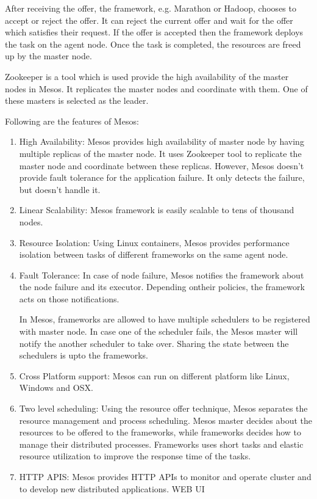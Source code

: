 After receiving the offer, the framework, e.g. Marathon or Hadoop, chooses to accept or reject the offer. It can reject the current offer and wait for the offer which satisfies their request. If the offer is accepted then the framework deploys the task on the agent node. Once the task is completed, the resources are freed up by the master node. 

Zookeeper is a tool which is used provide the high availability of the master nodes in Mesos. It replicates the master nodes and coordinate with them. One of these masters is selected as the leader.


Following are the features of Mesos:

\begin{enumerate}
\item High Availability: Mesos provides high availability of master node by having multiple replicas of the master node. It uses Zookeeper tool to replicate the master node and coordinate between these replicas. However, Mesos doesn't provide fault tolerance for the application failure. It only detects the failure, but doesn't handle it.

\item Linear Scalability: Mesos framework is easily scalable to tens of thousand nodes.

\item Resource Isolation: Using Linux containers, Mesos provides performance isolation between tasks of different frameworks on the same agent node.

\item Fault Tolerance: In case of node failure, Mesos notifies the framework about the node failure and its executor. Depending ontheir policies, the framework acts on those notifications.

In Mesos, frameworks are allowed to have multiple schedulers to be registered with master node. In case one of the scheduler fails, the Mesos master will notify the another scheduler to take over. Sharing the state between the schedulers is upto the frameworks.

\item Cross Platform support: Mesos can run on different platform like Linux, Windows and OSX.

\item Two level scheduling: Using the resource offer technique, Mesos separates the resource management and process scheduling.  Mesos master decides about the resources to be offered to the frameworks, while frameworks decides how to manage their distributed processes. Frameworks uses short tasks and elastic resource utilization to improve the response time of the tasks.

\item HTTP APIS: Mesos provides HTTP APIs to monitor and operate cluster and to develop new distributed applications.
WEB UI

\end{enumerate}



















